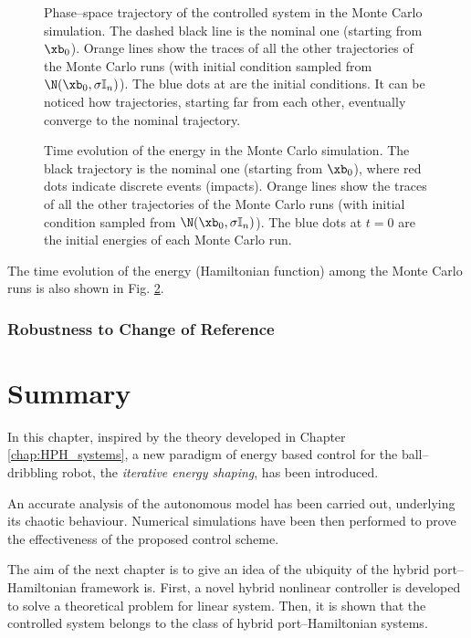 %
\begin{figure}[!ht]
    \centering
    \caption[Phase--space trajectory of the controlled system in the Monte Carlo simulation]{Phase--space trajectory of the controlled system in the Monte Carlo simulation. The dashed black line is the nominal one (starting from $\xb_0$). Orange lines show the traces of all the other trajectories of the Monte Carlo runs (with initial condition sampled from $\N(\xb_0,\sigma\mathbb{I}_n)$). The blue dots at are the initial conditions. It can be noticed how trajectories, starting far from each other, eventually converge to the nominal trajectory.}
    \label{fig:reg2}
\end{figure}
%
\begin{figure}[!ht]
    \centering
    \caption[Time evolution of the energy in the Monte Carlo simulation]{Time evolution of the energy in the Monte Carlo simulation. The black trajectory is the nominal one (starting from $\xb_0$), where red dots indicate discrete events (impacts). Orange lines show the traces of all the other trajectories of the Monte Carlo runs (with initial condition sampled from $\N(\xb_0,\sigma\mathbb{I}_n)$). The blue dots at $t=0$ are the initial energies of each Monte Carlo run.}
    \label{fig:reg3}
\end{figure}

The time evolution of the energy (Hamiltonian function) among the Monte Carlo runs is also shown in Fig. \ref{fig:reg3}.
%
\subsubsection{Robustness to Change of Reference}
%
\clearpage
\section{Summary}\label{sec:concl}
%
In this chapter, inspired by the theory developed in Chapter \ref{chap:HPH_systems}, a new paradigm of energy based control for the ball--dribbling robot, the \textit{iterative energy shaping}, has been introduced.
%
\newline

%
An accurate analysis of the autonomous model has been carried out, underlying its chaotic behaviour.
Numerical simulations have been then performed to prove the effectiveness of the proposed control scheme.
%
\newline

%
The aim of the next chapter is to give an idea of the ubiquity of the hybrid port--Hamiltonian framework is. First, a novel hybrid nonlinear controller is developed to solve a theoretical problem for linear system. Then, it is shown that the controlled system belongs to the class of hybrid port--Hamiltonian systems. 
